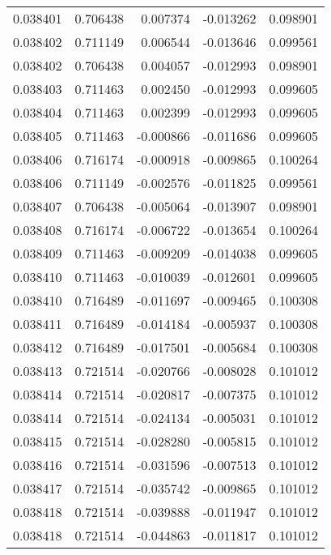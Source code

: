 \begin{tabular}{lrrrr}
0.038401    &  0.706438 &  0.007374 & -0.013262 &             0.098901 \\
0.038402    &  0.711149 &  0.006544 & -0.013646 &             0.099561 \\
0.038402    &  0.706438 &  0.004057 & -0.012993 &             0.098901 \\
0.038403    &  0.711463 &  0.002450 & -0.012993 &             0.099605 \\
0.038404    &  0.711463 &  0.002399 & -0.012993 &             0.099605 \\
0.038405    &  0.711463 & -0.000866 & -0.011686 &             0.099605 \\
0.038406    &  0.716174 & -0.000918 & -0.009865 &             0.100264 \\
0.038406    &  0.711149 & -0.002576 & -0.011825 &             0.099561 \\
0.038407    &  0.706438 & -0.005064 & -0.013907 &             0.098901 \\
0.038408    &  0.716174 & -0.006722 & -0.013654 &             0.100264 \\
0.038409    &  0.711463 & -0.009209 & -0.014038 &             0.099605 \\
0.038410    &  0.711463 & -0.010039 & -0.012601 &             0.099605 \\
0.038410    &  0.716489 & -0.011697 & -0.009465 &             0.100308 \\
0.038411    &  0.716489 & -0.014184 & -0.005937 &             0.100308 \\
0.038412    &  0.716489 & -0.017501 & -0.005684 &             0.100308 \\
0.038413    &  0.721514 & -0.020766 & -0.008028 &             0.101012 \\
0.038414    &  0.721514 & -0.020817 & -0.007375 &             0.101012 \\
0.038414    &  0.721514 & -0.024134 & -0.005031 &             0.101012 \\
0.038415    &  0.721514 & -0.028280 & -0.005815 &             0.101012 \\
0.038416    &  0.721514 & -0.031596 & -0.007513 &             0.101012 \\
0.038417    &  0.721514 & -0.035742 & -0.009865 &             0.101012 \\
0.038418    &  0.721514 & -0.039888 & -0.011947 &             0.101012 \\
0.038418    &  0.721514 & -0.044863 & -0.011817 &             0.101012 \\

\end{tabular}
